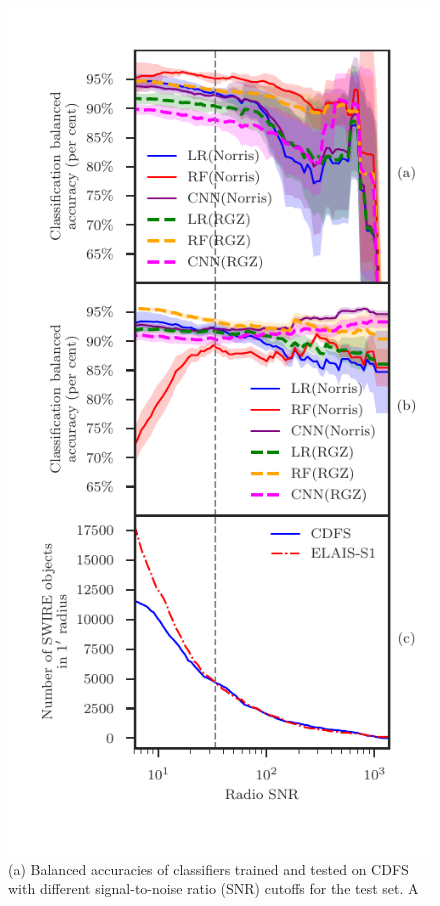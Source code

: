 \documentclass[fleqn,usenatbib,usedcolumn]{mnras}
\begin{document}
  \begin{figure}
    \centering
    \includegraphics[trim={0cm 1cm 0cm 0.5cm}, clip]{images/accuracies-flux-snr.pdf}
    \caption{(a) Balanced accuracies of classifiers trained and tested on CDFS
      with different signal-to-noise ratio (SNR) cutoffs for the test set. A
}
\end{figure}
\end{document}
